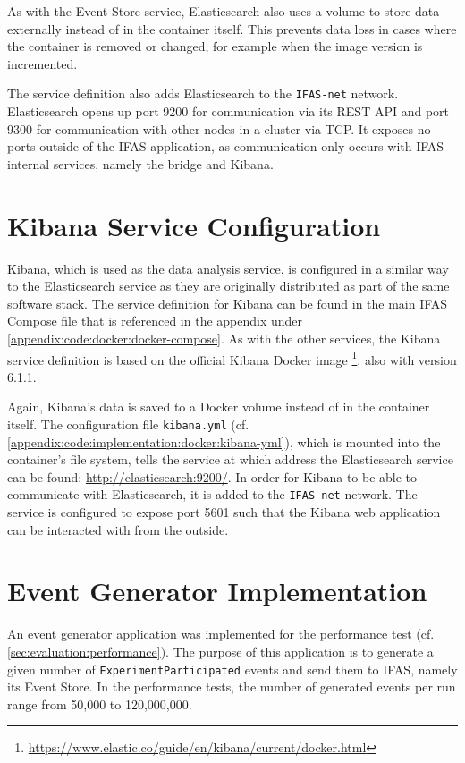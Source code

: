 As with the Event Store service, Elasticsearch also uses a volume to store data externally instead of in the container itself.
This prevents data loss in cases where the container is removed or changed, for example when the image version is incremented.

The service definition also adds Elasticsearch to the \texttt{IFAS-net} network.
Elasticsearch opens up port 9200 for communication via its \ac{REST} \ac{API} and port 9300 for communication with other nodes in a cluster via \ac{TCP}.
It exposes no ports outside of the \ac{IFAS} application, as communication only occurs with \ac{IFAS}-internal services, namely the bridge and Kibana.

\section{Kibana Service Configuration}
\label{sec:implementation:analysis}

Kibana, which is used as the data analysis service, is configured in a similar way to the Elasticsearch service as they are originally distributed as part of the same software stack.
The service definition for Kibana can be found in the main \ac{IFAS} Compose file that is referenced in the appendix under \cref{appendix:code:docker:docker-compose}.
As with the other services, the Kibana service definition is based on the official Kibana Docker image \footnote{\url{https://www.elastic.co/guide/en/kibana/current/docker.html}}, also with version 6.1.1.

Again, Kibana's data is saved to a Docker volume instead of in the container itself.
The configuration file \texttt{kibana.yml} (cf. \cref{appendix:code:implementation:docker:kibana-yml}), which is mounted into the container's file system, tells the service at which address the Elasticsearch service can be found: \url{http://elasticsearch:9200/}.
In order for Kibana to be able to communicate with Elasticsearch, it is added to the \texttt{IFAS-net} network.
The service is configured to expose port 5601 such that the Kibana web application can be interacted with from the outside.

\section{Event Generator Implementation}
\label{sec:implementation:event-generator}

An event generator application was implemented for the performance test (cf. \cref{sec:evaluation:performance}).
The purpose of this application is to generate a given number of \texttt{ExperimentParticipated} events and send them to \ac{IFAS}, namely its Event Store.
In the performance tests, the number of generated events per run range from 50,000 to 120,000,000.

